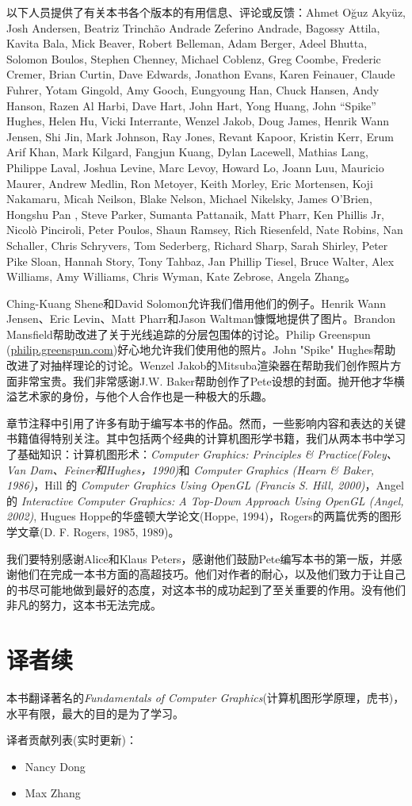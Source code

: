 以下人员提供了有关本书各个版本的有用信息、评论或反馈：Ahmet O\u{g}uz Aky{\"u}z, Josh Andersen, Beatriz Trinch\~ao Andrade Zeferino Andrade, Bagossy Attila, Kavita Bala, Mick Beaver, Robert Belleman, Adam Berger, Adeel Bhutta, Solomon Boulos, Stephen Chenney, Michael Coblenz, Greg Coombe, Frederic Cremer, Brian Curtin, Dave Edwards, Jonathon Evans, Karen Feinauer, Claude Fuhrer, Yotam Gingold, Amy Gooch, Eungyoung Han, Chuck Hansen, Andy Hanson, Razen Al Harbi, Dave Hart, John Hart, Yong Huang, John “Spike” Hughes, Helen Hu, Vicki Interrante, Wenzel Jakob, Doug James, Henrik Wann Jensen, Shi Jin, Mark Johnson, Ray Jones, Revant Kapoor, Kristin Kerr, Erum Arif Khan, Mark Kilgard, Fangjun Kuang, Dylan Lacewell, Mathias Lang, Philippe Laval, Joshua Levine, Marc Levoy, Howard Lo, Joann Luu, Mauricio Maurer, Andrew Medlin, Ron Metoyer, Keith Morley, Eric Mortensen, Koji Nakamaru, Micah Neilson, Blake Nelson,
Michael Nikelsky, James O'Brien, Hongshu Pan , Steve Parker, Sumanta Pattanaik, Matt Pharr, Ken Phillis Jr,  Nicol{\`o} Pinciroli, Peter Poulos, Shaun Ramsey, Rich Riesenfeld, Nate Robins, Nan Schaller, Chris Schryvers, Tom Sederberg, Richard Sharp, Sarah Shirley, Peter Pike Sloan, Hannah Story, Tony Tahbaz, Jan Phillip Tiesel, Bruce Walter, Alex Williams, Amy Williams, Chris Wyman, Kate Zebrose, Angela Zhang。

Ching-Kuang Shene和David Solomon允许我们借用他们的例子。Henrik Wann Jensen、Eric Levin、Matt Pharr和Jason Waltman慷慨地提供了图片。Brandon Mansfield帮助改进了关于光线追踪的分层包围体的讨论。Philip Greenspun (\url{philip.greenspun.com})好心地允许我们使用他的照片。John "Spike" Hughes帮助改进了对抽样理论的讨论。Wenzel Jakob的Mitsuba渲染器在帮助我们创作照片方面非常宝贵。我们非常感谢J.W. Baker帮助创作了Pete设想的封面。抛开他才华横溢艺术家的身份，与他个人合作也是一种极大的乐趣。

章节注释中引用了许多有助于编写本书的作品。然而，一些影响内容和表达的关键书籍值得特别关注。其中包括两个经典的计算机图形学书籍，我们从两本书中学习了基础知识：计算机图形术：\textit{Computer Graphics: Principles \& Practice(Foley、Van Dam、Feiner和Hughes，1990)}和\textit{ Computer Graphics (Hearn \& Baker, 1986)}，Hill 的 \textit{Computer Graphics Using OpenGL (Francis S. Hill, 2000)}，Angel 的 \textit{Interactive Computer Graphics: A Top-Down Approach Using OpenGL (Angel, 2002)}, Hugues Hoppe的华盛顿大学论文(Hoppe, 1994)，Rogers的两篇优秀的图形学文章(D. F. Rogers, 1985, 1989)。

我们要特别感谢Alice和Klaus Peters，感谢他们鼓励Pete编写本书的第一版，并感谢他们在完成一本书方面的高超技巧。他们对作者的耐心，以及他们致力于让自己的书尽可能地做到最好的态度，对这本书的成功起到了至关重要的作用。没有他们非凡的努力，这本书无法完成。


\section*{译者续}

本书翻译著名的\textit{Fundamentals of Computer Graphics}(计算机图形学原理，虎书)，水平有限，最大的目的是为了学习。

译者贡献列表(实时更新)：

\begin{itemize}
	\item Nancy Dong
	\item Max Zhang
\end{itemize}
